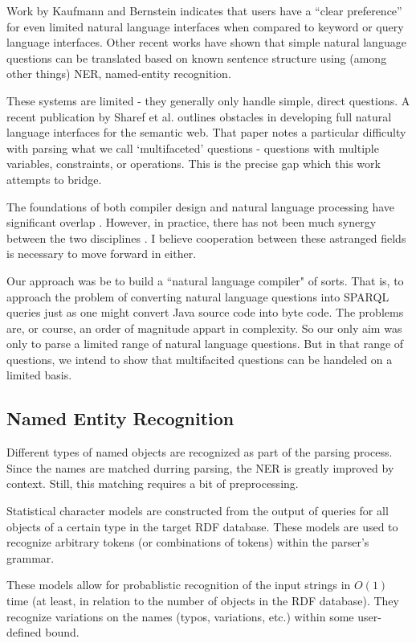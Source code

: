 \documentclass[11pt]{article}
\begin{document}
Work by Kaufmann and Bernstein \cite{usability} indicates
that users have a “clear preference” for even limited natural language interfaces
when compared to keyword or query language interfaces.
Other recent works \cite{mapping, freya, galitsky}
have shown that simple natural language questions can be translated based
on known sentence structure using (among other things) NER, named-entity recognition.

These systems are limited - they generally only handle simple, direct questions.
A recent publication by Sharef et al. \cite{issues} outlines obstacles in developing full
natural language interfaces for the semantic web. That paper notes a particular
difficulty with parsing what we call `multifaceted' questions - questions with multiple
variables, constraints, or operations. This is the precise gap which this work
attempts to bridge.

The foundations of both compiler design and natural language processing
have significant overlap \cite{chomsky, reghizzi}.
However, in practice, there has not been
much synergy between the two disciplines \cite{aho, anatomy, reghizzi}.
I believe cooperation between these astranged fields is necessary to move forward
in either.

Our approach was be to build a ``natural language compiler" of sorts.
That is, to approach the problem of converting natural language questions into
SPARQL queries just as one might convert Java source code into byte code.
The problems are, or course, an order of magnitude appart in complexity.
So our only aim was only to parse a limited range of natural language questions.
But in that range of questions, we intend to show that multifacited questions
can be handeled on a limited basis.

\subsection{Named Entity Recognition}
Different types of named objects are recognized as part of the parsing process.
Since the names are matched durring parsing, the NER is greatly improved by context.
Still, this matching requires a bit of preprocessing.

Statistical character models are constructed from the output of queries for all 
objects of a certain type in the target RDF database. 
These models are used to recognize arbitrary tokens (or combinations of 
tokens) within the parser's grammar. 

These models allow for probablistic recognition of the input strings in 
$O(1)$ time (at least, in relation to the number of objects in the RDF
database). They recognize variations on the names (typos, variations, etc.)
within some user-defined bound. 
\end{document}
